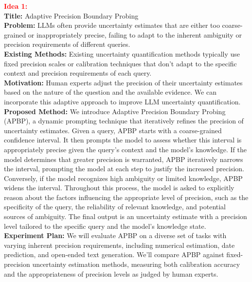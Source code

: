 \textbf{\textcolor{red}{Idea 1:}} \\
\textbf{Title:} Adaptive Precision Boundary Probing \\
\textbf{Problem:} LLMs often provide uncertainty estimates that are either too coarse-grained or inappropriately precise, failing to adapt to the inherent ambiguity or precision requirements of different queries. \\
\textbf{Existing Methods:}  Existing uncertainty quantification methods typically use fixed precision scales or calibration techniques that don't adapt to the specific context and precision requirements of each query. \\
\textbf{Motivation:} Human experts adjust the precision of their uncertainty estimates based on the nature of the question and the available evidence. We can incorporate this adaptive approach to improve LLM uncertainty quantification. \\
\textbf{Proposed Method:} We introduce Adaptive Precision Boundary Probing (APBP), a dynamic prompting technique that iteratively refines the precision of uncertainty estimates. Given a query, APBP starts with a coarse-grained confidence interval. It then prompts the model to assess whether this interval is appropriately precise given the query's context and the model's knowledge. If the model determines that greater precision is warranted, APBP iteratively narrows the interval, prompting the model at each step to justify the increased precision. Conversely, if the model recognizes high ambiguity or limited knowledge, APBP widens the interval. Throughout this process, the model is asked to explicitly reason about the factors influencing the appropriate level of precision, such as the specificity of the query, the reliability of relevant knowledge, and potential sources of ambiguity. The final output is an uncertainty estimate with a precision level tailored to the specific query and the model's knowledge state. \\
\textbf{Experiment Plan:}  We will evaluate APBP on a diverse set of tasks with varying inherent precision requirements, including numerical estimation, date prediction, and open-ended text generation. We'll compare APBP against fixed-precision uncertainty estimation methods, measuring both calibration accuracy and the appropriateness of precision levels as judged by human experts.

\vspace{0.5em}

